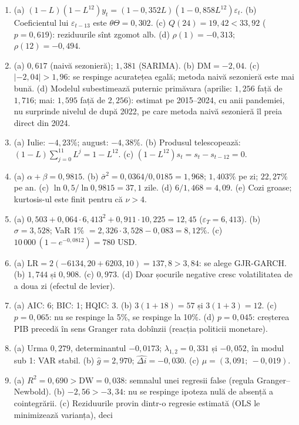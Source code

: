 \documentclass[10.5pt]{article}
\begin{document}
{\begin{enumerate}[label=\textbf{\arabic*.},leftmargin=2.2em,itemsep=0.25ex]
unitară. (b) ADF respinge ($p=0{,}001$), KPSS nu respinge ($0{,}203<0{,}463$): inflația este staționară.
(c) $\ln\mathrm{CPI}\sim I(1)$.
\item (a) $(1-L)(1-L^{12})y_t=(1-0{,}352L)(1-0{,}858L^{12})\varepsilon_t$. (b) Coeficientul lui $\varepsilon_{t-13}$ este $\theta\Theta=0{,}302$. (c) $Q(24)=19{,}42<33{,}92$ ($p=0{,}619$): reziduurile sînt zgomot alb. (d) $\rho(1)=-0{,}313$; $\rho(12)=-0{,}494$.
\item (a) $0{,}617$ (naivă sezonieră); $1{,}381$ (SARIMA). (b) $\mathrm{DM}=-2{,}04$. (c) $|-2{,}04|>1{,}96$: se respinge
acuratețea egală; metoda naivă sezonieră este mai bună. (d) Modelul subestimează puternic primăvara (aprilie: $1{,}256$
față de $1{,}716$; mai: $1{,}595$ față de $2{,}256$): estimat pe 2015--2024, cu anii pandemiei, nu surprinde nivelul de
după 2022, pe care metoda naivă sezonieră îl preia direct din 2024.
\item (a) Iulie: $-4{,}23\%$; august: $-4{,}38\%$. (b) Produsul telescopează: $(1-L)\sum_{j=0}^{11}L^j=1-L^{12}$.
(c) $(1-L^{12})s_t=s_t-s_{t-12}=0$.
\item (a) $\alpha+\beta=0{,}9815$. (b) $\bar\sigma^2=0{,}0364/0{,}0185=1{,}968$; $1{,}403\%$ pe zi; $22{,}27\%$ pe an. (c) $\ln 0{,}5/\ln 0{,}9815=37{,}1$ zile. (d) $6/1{,}468=4{,}09$. (e) Cozi groase; kurtosis-ul este finit pentru că $\nu>4$.
\item (a) $0{,}503+0{,}064\cdot 6{,}413^2+0{,}911\cdot 10{,}225=12{,}45$ ($\varepsilon_T=6{,}413$). (b) $\sigma=3{,}528$;
VaR 1\% $=2{,}326\cdot 3{,}528-0{,}083=8{,}12\%$. (c) $10\,000\,(1-e^{-0{,}0812})=780$ USD.
\item (a) $\mathrm{LR}=2(-6134{,}20+6203{,}10)=137{,}8>3{,}84$: se alege GJR-GARCH. (b) $1{,}744$ și $0{,}908$.
(c) $0{,}973$. (d) Doar șocurile negative cresc volatilitatea de a doua zi (efectul de levier).
\item (a) AIC: 6; BIC: 1; HQIC: 3. (b) $3(1+18)=57$ și $3(1+3)=12$. (c) $p=0{,}065$: nu se respinge la 5\%, se respinge
la 10\%. (d) $p=0{,}045$: creșterea PIB precedă în sens Granger rata dobînzii (reacția politicii monetare).
\item (a) Urma $0{,}279$, determinantul $-0{,}0173$; $\lambda_{1,2}=0{,}331$ și $-0{,}052$, în modul sub 1: VAR stabil.
(b) $\hat g=2{,}970$; $\widehat{\Delta i}=-0{,}030$. (c) $\mu=(3{,}091;\ -0{,}019)$.
\item (a) $R^2=0{,}690>\mathrm{DW}=0{,}038$: semnalul unei regresii false (regula Granger--Newbold). (b) $-2{,}56>-3{,}34$:
nu se respinge ipoteza nulă de absență a cointegrării. (c) Reziduurile provin dintr-o regresie estimată (OLS le minimizează varianța), deci

\end{enumerate}}
\end{document}
